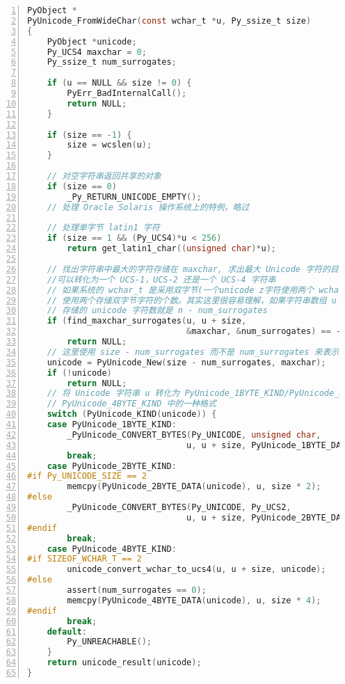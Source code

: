 \begin{lstlisting}[language=C, numbers=left, numbersep=1em, numberstyle=\footnotesize , breaklines=true]
PyObject *
PyUnicode_FromWideChar(const wchar_t *u, Py_ssize_t size)
{
    PyObject *unicode;
    Py_UCS4 maxchar = 0;
    Py_ssize_t num_surrogates;

    if (u == NULL && size != 0) {
        PyErr_BadInternalCall();
        return NULL;
    }

    if (size == -1) {
        size = wcslen(u);
    }

    // 对空字符串返回共享的对象
    if (size == 0)
        _Py_RETURN_UNICODE_EMPTY();
    // 处理 Oracle Solaris 操作系统上的特例，略过

    // 处理单字节 latin1 字符
    if (size == 1 && (Py_UCS4)*u < 256)
        return get_latin1_char((unsigned char)*u);

    // 找出字符串中最大的字符存储在 maxchar, 求出最大 Unicode 字符的目的是为了确定这个 Unicode 字符串
    //可以转化为一个 UCS-1，UCS-2 还是一个 UCS-4 字符串
    // 如果系统的 wchar_t 是采用双字节(一个unicode z字符使用两个 wchar_t 存储), 那么 num_surrogates 表示
    // 使用两个存储双字节字符的个数。其实这里很容易理解，如果字符串数组 u 的 size 是 n，那么字符串中
    // 存储的 unicode 字符数就是 n - num_surrogates
    if (find_maxchar_surrogates(u, u + size,
                                &maxchar, &num_surrogates) == -1)
        return NULL;
    // 这里使用 size - num_surrogates 而不是 num_surrogates 来表示字符数目是因为 u 的末尾可能有一个空字符
    unicode = PyUnicode_New(size - num_surrogates, maxchar);
    if (!unicode)
        return NULL;
    // 将 Unicode 字符串 u 转化为 PyUnicode_1BYTE_KIND/PyUnicode_2BYTE_KIND/
    // PyUnicode_4BYTE_KIND 中的一种格式
    switch (PyUnicode_KIND(unicode)) {
    case PyUnicode_1BYTE_KIND:
        _PyUnicode_CONVERT_BYTES(Py_UNICODE, unsigned char,
                                u, u + size, PyUnicode_1BYTE_DATA(unicode));
        break;
    case PyUnicode_2BYTE_KIND:
#if Py_UNICODE_SIZE == 2
        memcpy(PyUnicode_2BYTE_DATA(unicode), u, size * 2);
#else
        _PyUnicode_CONVERT_BYTES(Py_UNICODE, Py_UCS2,
                                u, u + size, PyUnicode_2BYTE_DATA(unicode));
#endif
        break;
    case PyUnicode_4BYTE_KIND:
#if SIZEOF_WCHAR_T == 2
        unicode_convert_wchar_to_ucs4(u, u + size, unicode);
#else
        assert(num_surrogates == 0);
        memcpy(PyUnicode_4BYTE_DATA(unicode), u, size * 4);
#endif
        break;
    default:
        Py_UNREACHABLE();
    }
    return unicode_result(unicode);
}
\end{lstlisting}


